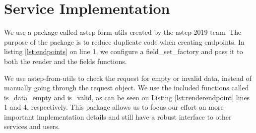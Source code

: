 \section{Service Implementation}

We use a package called astep-form-utils created by the \gls{astep}-2019 team. The purpose of the package is to reduce duplicate code when creating endpoints. In listing \ref{lst:endpoints} on line 1, we configure a field\_set\_factory and pass it to both the render and the fields functions.


\noindent
We use astep-from-utils to check the request for empty or invalid data, instead of manually going through the request object. We use the included functions called is\_data\_empty and is\_valid, as can be seen on Listing \ref{lst:renderendpoint} lines 1 and 4, respectively. This package allows us to focus our effort on more important implementation details and still have a robust interface to other services and users.

